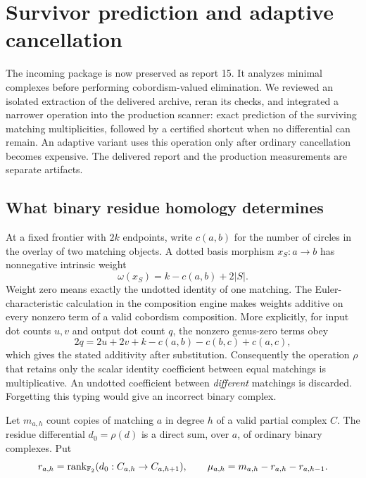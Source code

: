 \section{Survivor prediction and adaptive cancellation}
\label{sec:radical-adaptive}

The incoming package 
is now preserved as report 15. It analyzes minimal complexes before
performing cobordism-valued elimination.
We reviewed an isolated extraction of the delivered archive, reran its
checks, and integrated a narrower operation into the production scanner:
exact prediction of the surviving matching multiplicities, followed by a
certified shortcut when no differential can remain. An adaptive variant
uses this operation only after ordinary cancellation becomes expensive.
The delivered report and the production measurements are separate artifacts.

\subsection{What binary residue homology determines}
At a fixed frontier with $2k$ endpoints, write $c(a,b)$ for the number of
circles in the overlay of two matching objects. A dotted basis morphism
$x_S:a\to b$ has nonnegative intrinsic weight
\[
  \omega(x_S)=k-c(a,b)+2|S|.
\]
Weight zero means exactly the undotted identity of one matching.
The Euler-characteristic calculation in the composition engine makes
weights additive on every nonzero term of a valid cobordism composition.
More explicitly, for input dot counts $u,v$ and output dot count $q$,
the nonzero genus-zero terms obey
\[
  2q=2u+2v+k-c(a,b)-c(b,c)+c(a,c),
\]
which gives the stated additivity after substitution. Consequently the
operation $\rho$ that retains only the scalar identity coefficient
between equal matchings is multiplicative. An undotted coefficient
between \emph{different} matchings is discarded. Forgetting this typing
would give an incorrect binary complex.

Let $m_{a,h}$ count copies of matching $a$ in degree $h$ of a valid
partial complex $C$. The residue differential $d_0=\rho(d)$ is a direct
sum, over $a$, of ordinary binary complexes. Put
\[
 r_{a,h}=\operatorname{rank}_{\mathbb{F}_2}(d_0:C_{a,h}\to C_{a,h+1}),\qquad
 \mu_{a,h}=m_{a,h}-r_{a,h}-r_{a,h-1}.
\]

